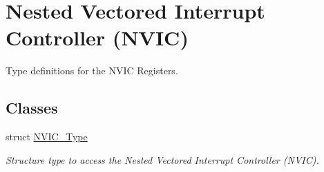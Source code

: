 \hypertarget{group__CMSIS__NVIC}{}\section{Nested Vectored Interrupt Controller (N\+V\+IC)}
\label{group__CMSIS__NVIC}


Type definitions for the N\+V\+IC Registers.  


\subsection*{Classes}
\begin{DoxyCompactItemize}
\item 
struct \hyperlink{structNVIC__Type}{N\+V\+I\+C\+\_\+\+Type}
\begin{DoxyCompactList}\small\item\em Structure type to access the Nested Vectored Interrupt Controller (N\+V\+IC). \end{DoxyCompactList}\end{DoxyCompactItemize}
